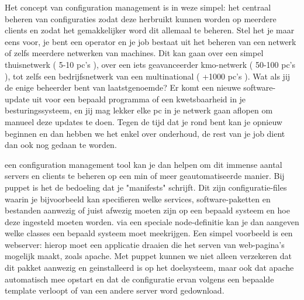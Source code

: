 
Het concept van configuration management is in weze simpel: het centraal beheren van configuraties zodat deze herbruikt kunnen worden op meerdere clients en zodat het gemakkelijker word dit allemaal te beheren.
Stel het je maar eens voor, je bent een operator en je job bestaat uit het beheren van een netwerk of zelfs meerdere netwerken van machines.
Dit kan gaan over een simpel thuisnetwerk ( 5-10 pc's ), over een iets geavanceerder kmo-netwerk ( 50-100 pc's ), tot zelfs een bedrijfsnetwerk van een multinational ( +1000 pc's ).
Wat als jij de enige beheerder bent van laatstgenoemde? Er komt een nieuwe software-update uit voor een bepaald programma of een kwetsbaarheid in je besturingssysteem, en jij mag lekker elke pc in je netwerk gaan aflopen om manueel deze updates te doen.
Tegen de tijd dat je rond bent kan je opnieuw beginnen en dan hebben we het enkel over onderhoud, de rest van je job dient dan ook nog gedaan te worden.

een configuration management tool kan je dan helpen om dit immense aantal servers en clients te beheren op een min of meer geautomatiseerde manier.
Bij puppet is het de bedoeling dat je "manifests" schrijft. Dit zijn configuratie-files waarin je bijvoorbeeld kan specifieren welke services, software-paketten en bestanden aanwezig of juist afwezig moeten zijn op een bepaald systeem en hoe deze ingesteld moeten worden. via een speciale node-definitie kan je dan aangeven welke classes een bepaald systeem moet meekrijgen. Een simpel voorbeeld is een webserver: hierop moet een applicatie draaien die het serven van web-pagina's mogelijk maakt, zoals apache. Met puppet kunnen we niet alleen verzekeren dat dit pakket aanwezig en geinstalleerd is op het doelsysteem, maar ook dat apache automatisch mee opstart en dat de configuratie ervan volgens een bepaalde template verloopt of van een andere server word gedownload.

